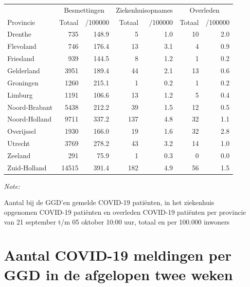 \documentclass[
  english,
  man,floatsintext]{apa6}
\begin{document}
\begin{table}[H]
\centering
\begin{threeparttable}
\begin{tabular}{lrrrrrr}
\toprule
\multicolumn{1}{c}{ } & \multicolumn{2}{c}{Besmettingen} & \multicolumn{2}{c}{Ziekenhuisopnames} & \multicolumn{2}{c}{Overleden} \\
\cmidrule(l{3pt}r{3pt}){2-3} \cmidrule(l{3pt}r{3pt}){4-5} \cmidrule(l{3pt}r{3pt}){6-7}
Provincie & Totaal & /100000 & Totaal & /100000 & Totaal & /100000\\
\midrule
Drenthe & 735 & 148.9 & 5 & 1.0 & 10 & 2.0\\
Flevoland & 746 & 176.4 & 13 & 3.1 & 4 & 0.9\\
Friesland & 939 & 144.5 & 8 & 1.2 & 1 & 0.2\\
Gelderland & 3951 & 189.4 & 44 & 2.1 & 13 & 0.6\\
Groningen & 1260 & 215.1 & 1 & 0.2 & 1 & 0.2\\
Limburg & 1191 & 106.6 & 13 & 1.2 & 5 & 0.4\\
Noord-Brabant & 5438 & 212.2 & 39 & 1.5 & 12 & 0.5\\
Noord-Holland & 9711 & 337.2 & 137 & 4.8 & 32 & 1.1\\
Overijssel & 1930 & 166.0 & 19 & 1.6 & 32 & 2.8\\
Utrecht & 3769 & 278.2 & 43 & 3.2 & 14 & 1.0\\
Zeeland & 291 & 75.9 & 1 & 0.3 & 0 & 0.0\\
Zuid-Holland & 14515 & 391.4 & 182 & 4.9 & 56 & 1.5\\
\bottomrule
\end{tabular}
\begin{tablenotes}
\item \textit{Note: } 
\item Aantal bij de GGD’en gemelde COVID-19 patiënten, in het ziekenhuis opgenomen COVID-19 patiënten en overleden COVID-19 patiënten per provincie van 21 september t/m 05 oktober 10:00 uur, totaal en per 100.000 inwoners
\end{tablenotes}
\end{threeparttable}
\end{table}

\newpage

\hypertarget{aantal-covid-19-meldingen-per-ggd-in-de-afgelopen-twee-weken}{%
\section{Aantal COVID-19 meldingen per GGD in de afgelopen twee weken}\label{aantal-covid-19-meldingen-per-ggd-in-de-afgelopen-twee-weken}}
\end{document}
